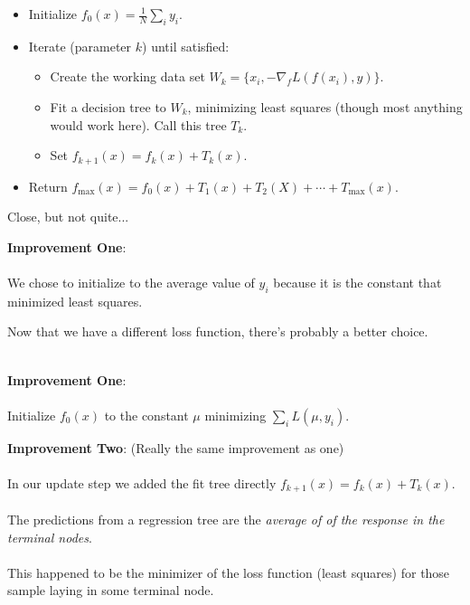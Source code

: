 \begin{frame}
\begin{itemize}
  \item Initialize $f_0(x) = \frac{1}{N} \sum_i y_i$.
  \item Iterate (parameter $k$) until satisfied: \begin{itemize}
    \item Create the working data set $W_k = \{ x_i, - \nabla_f L(f(x_i), y) \}$.
    \item Fit a decision tree to $W_k$, minimizing least squares (though most anything would work here).  Call this tree $T_k$.
    \item Set $f_{k+1}(x) = f_{k}(x) + T_{k}(x)$. 
  \end{itemize}
  \item Return $f_{\text{max}}(x) = f_0(x) + T_1(x) + T_2(X) + \cdots + T_{\text{max}}(x)$.
\end{itemize}

Close, but not quite...
\end{frame}
%
\begin{frame}
\textbf{Improvement One}:\\~\\

We chose to initialize to the average value of $y_i$ because it is the constant that minimized least squares.

Now that we have a different loss function, there's probably a better choice.\\~\\
\end{frame}
%
\begin{frame}
\textbf{Improvement One}:\\~\\

Initialize $f_0(x)$ to the constant $\mu$ minimizing $\sum_i L(\mu, y_i)$.
\end{frame}
%
\begin{frame}
\textbf{Improvement Two}: (Really the same improvement as one)\\~\\

In our update step we added the fit tree directly $f_{k+1}(x) = f_{k}(x) + T_{k}(x)$.\\~\\

The predictions from a regression tree are the \textit{average of of the response in the terminal nodes}.\\~\\

This happened to be the minimizer of the loss function (least squares) for those sample laying in some terminal node.
\end{frame}
